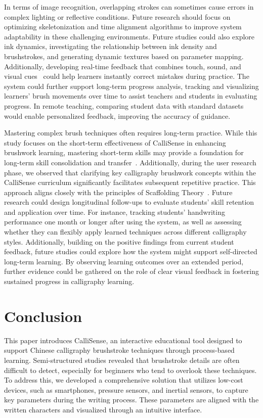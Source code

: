 In terms of image recognition, overlapping strokes can sometimes cause errors in complex lighting or reflective conditions. Future research should focus on optimizing skeletonization and time alignment algorithms to improve system adaptability in these challenging environments. Future studies could also explore ink dynamics\cite{Matsumaru_2017jaciii}, investigating the relationship between ink density and brushstrokes, and generating dynamic textures based on parameter mapping. Additionally, developing real-time feedback that combines touch, sound, and visual cues~\cite{10.1145/3281505.3281604, 10.1145/3305367.3327993} could help learners instantly correct mistakes during practice. The system could further support long-term progress analysis, tracking and visualizing learners' brush movements over time to assist teachers and students in evaluating progress. In remote teaching, comparing student data with standard datasets would enable personalized feedback, improving the accuracy of guidance.


Mastering complex brush techniques often requires long-term practice. While this study focuses on the short-term effectiveness of CalliSense in enhancing brushwork learning, mastering short-term skills may provide a foundation for long-term skill consolidation and transfer~\cite{billing2007teaching}. Additionally, during the user research phase, we observed that clarifying key calligraphy brushwork concepts within the CalliSense curriculum significantly facilitates subsequent repetitive practice. This approach aligns closely with the principles of Scaffolding Theory~\cite{van2002scaffolding}. Future research could design longitudinal follow-ups to evaluate students' skill retention and application over time. For instance, tracking students' handwriting performance one month or longer after using the system, as well as assessing whether they can flexibly apply learned techniques across different calligraphy styles. Additionally, building on the positive findings from current student feedback, future studies could explore how the system might support self-directed long-term learning. By observing learning outcomes over an extended period, further evidence could be gathered on the role of clear visual feedback in fostering sustained progress in calligraphy learning.


\section{Conclusion}
This paper introduces CalliSense, an interactive educational tool designed to support Chinese calligraphy brushstroke techniques through process-based learning. Semi-structured studies revealed that brushstroke details are often difficult to detect, especially for beginners who tend to overlook these techniques. To address this, we developed a comprehensive solution that utilizes low-cost devices, such as smartphones, pressure sensors, and inertial sensors, to capture key parameters during the writing process. These parameters are aligned with the written characters and visualized through an intuitive interface. 

